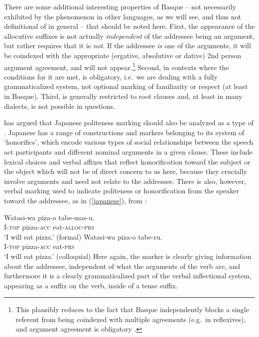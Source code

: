 \documentclass[output=paper, modfonts, nonflat]{langsci/langscibook}
\begin{document}
There are some additional interesting properties of Basque \allagr{}
-- not necessarily exhibited by the phenomenon in other languages, as
we will see, and thus not definitional of \allagr{} in general --
that should be noted here. First, the appearance of the allocutive
suffixes is not actually \emph{independent} of the addressee being an
argument, but rather requires that it is \emph{not}. If the addressee
\emph{is} one of the arguments, it will be coindexed with the
appropriate (ergative, absolutive or dative) 2nd person argument
agreement, and \allagr{} will not appear.\footnote{This plausibly
  reduces to the fact that Basque independently blocks a single
  referent from being coindexed with multiple agreements (e.g.\ in
  reflexives), and argument agreement is obligatory
  \citep{antonov:2015}.} Second, in contexts where the conditions for
it are met, \allagr{} is obligatory, i.e.\ we are dealing with a fully
grammaticalized system, not optional marking of familiarity or respect
(at least in Basque). Third, \allagr{} is generally restricted to root
clauses and, at least in many dialects, is not possible in questions.

\citet{miyagawa:2017} has argued that Japanese politeness marking
should also be analyzed as a type of \allagr{}. Japanese has a range
of constructions and markers belonging to its system of `honorifics',
which encode various types of social relationships between the speech
act participants and different nominal arguments in a given
clause. These include lexical choices and verbal affixes that reflect
honorification toward the subject or the object which will not be of
direct concern to us here, because they crucially involve arguments
and need not relate to the addressee. There is also, however, verbal
marking used to indicate politeness or honorification from the speaker
toward the addressee, as in (\ref{japanese}), from
\citet{miyagawa:2017}:

\ea\label{japanese}
  \ea\label{fjap}\gll Watasi-wa piza-o tabe-mas-u.\\
  I-\textsc{top} pizza-\textsc{acc}{} eat-\textsc{alloc}-\textsc{prs}\\
  \glt `I will eat pizza.' (formal)
  \ex\label{cjap}\gll Watasi-wa piza-o tabe-ru.\\
  I-\textsc{top} pizza-\textsc{acc}{} eat-\textsc{prs}\\
  \glt `I will eat pizza.' (colloquial)
  \z
\z
%
Here again, the marker is clearly giving information about the
addressee, independent of what the arguments of the verb are, and
furthermore it is a clearly grammaticalized part of the verbal
inflectional system, appearing as a suffix on the verb, inside of a
tense suffix. 
\end{document}
